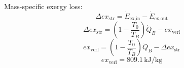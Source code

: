 Mass-specific exergy loss:  
\[ \Delta ex_{\text{str}} = \dot{E}_{\text{ex,in}} - \dot{E}_{\text{ex,out}} \]  
\[ \Delta ex_{\text{str}} = (1 - \frac{T_0}{T_B}) \dot{Q}_B - ex_{\text{verl}} \]  
\[ ex_{\text{verl}} = (1 - \frac{T_0}{T_B}) \dot{Q}_B - \Delta ex_{\text{str}} \]  
\[ ex_{\text{verl}} = 809.1 \, \text{kJ/kg} \]